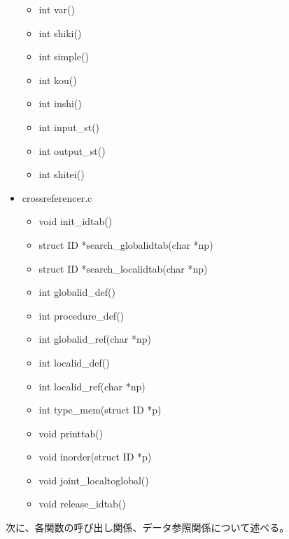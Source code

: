 \documentclass{jarticle}
\begin{document}
\begin{itemize}
\begin{itemize}
    \item int var()
    \item int shiki()
    \item int simple()
    \item int kou()
    \item int inshi()
    \item int input\_st()
    \item int output\_st()
    \item int shitei()
  \end{itemize}
  \item crossreferencer.c
  \begin{itemize}
    \item void init\_idtab()
    \item struct ID *search\_globalidtab(char *np)
    \item struct ID *search\_localidtab(char *np)
    \item int globalid\_def()
    \item int procedure\_def()
    \item int globalid\_ref(char *np)
    \item int localid\_def()
    \item int localid\_ref(char *np)
    \item int type\_mem(struct ID *p)
    \item void printtab()
    \item void inorder(struct ID *p)
    \item void joint\_localtoglobal()
    \item void release\_idtab()
  \end{itemize}
\end{itemize}
次に、各関数の呼び出し関係、データ参照関係について述べる。
\end{document}
